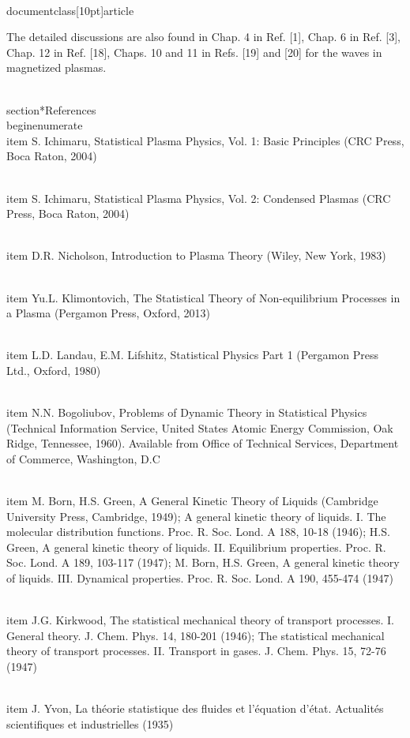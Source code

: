 \\documentclass[10pt]{article}
\begin{document}
{{{{The detailed discussions are also found in Chap. 4 in Ref. [1], Chap. 6 in Ref. [3], Chap. 12 in Ref. [18], Chaps. 10 and 11 in Refs. [19] and [20] for the waves in magnetized plasmas.

\\section*{References}
\\begin{enumerate}
  \\item S. Ichimaru, Statistical Plasma Physics, Vol. 1: Basic Principles (CRC Press, Boca Raton, 2004)

  \\item S. Ichimaru, Statistical Plasma Physics, Vol. 2: Condensed Plasmas (CRC Press, Boca Raton, 2004)

  \\item D.R. Nicholson, Introduction to Plasma Theory (Wiley, New York, 1983)

  \\item Yu.L. Klimontovich, The Statistical Theory of Non-equilibrium Processes in a Plasma (Pergamon Press, Oxford, 2013)

  \\item L.D. Landau, E.M. Lifshitz, Statistical Physics Part 1 (Pergamon Press Ltd., Oxford, 1980)

  \\item N.N. Bogoliubov, Problems of Dynamic Theory in Statistical Physics (Technical Information Service, United States Atomic Energy Commission, Oak Ridge, Tennessee, 1960). Available from Office of Technical Services, Department of Commerce, Washington, D.C

  \\item M. Born, H.S. Green, A General Kinetic Theory of Liquids (Cambridge University Press, Cambridge, 1949); A general kinetic theory of liquids. I. The molecular distribution functions. Proc. R. Soc. Lond. A 188, 10-18 (1946); H.S. Green, A general kinetic theory of liquids. II. Equilibrium properties. Proc. R. Soc. Lond. A 189, 103-117 (1947); M. Born, H.S. Green, A general kinetic theory of liquids. III. Dynamical properties. Proc. R. Soc. Lond. A 190, 455-474 (1947)

  \\item J.G. Kirkwood, The statistical mechanical theory of transport processes. I. General theory. J. Chem. Phys. 14, 180-201 (1946); The statistical mechanical theory of transport processes. II. Transport in gases. J. Chem. Phys. 15, 72-76 (1947)

  \\item J. Yvon, La théorie statistique des fluides et l'équation d'état. Actualités scientifiques et industrielles (1935)

}}}}
\end{document}
